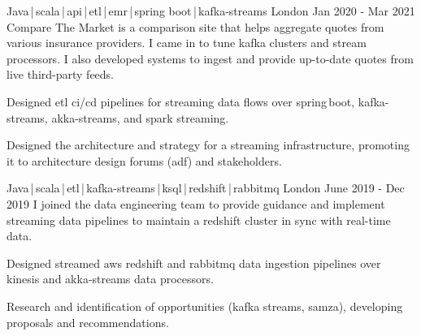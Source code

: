 \begin{cventries}
    \cventry
    {Java\,|\,scala\,|\,api\,|\,etl\,|\,emr\,|\,spring boot\,|\,kafka-streams}
    {} 
    {London}
    {Jan 2020 - Mar 2021}
    {Compare The Market is a comparison site that helps aggregate quotes from various insurance providers. I came in to tune kafka clusters and stream processors. I also developed systems to ingest and provide up-to-date quotes from live third-party feeds.}
    {
        \begin{cvitems}
            \item{Designed etl ci/cd pipelines for streaming data flows over spring\,boot, kafka-streams, akka-streams, and spark streaming.}
            \item{Designed the architecture and strategy for a streaming infrastructure, promoting it to architecture design forums (adf) and stakeholders.}
        \end{cvitems}
    }

    \cventry
    {Java\,|\,scala\,|\,etl\,|\,kafka-streams\,|\,ksql\,|\,redshift\,|\,rabbitmq}
    {} 
    {London}
    {June 2019 - Dec 2019}
    {I joined the data engineering team to provide guidance and implement streaming data pipelines to maintain a redshift cluster in sync with real-time data.}
    {
        \begin{cvitems}
            \item{Designed streamed aws redshift and rabbitmq data ingestion pipelines over kinesis and akka-streams data processors. }
            \item{Research and identification of opportunities (kafka streams, samza), developing proposals and recommendations.}
        \end{cvitems}
    }


\end{cventries}
